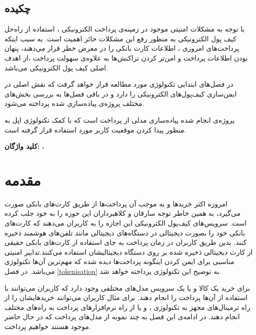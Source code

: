 \documentclass[oneside]{report}
\begin{document}
 
 \section*{چکیده}
\Large \noindent
با توجه به مشکلات امنیتی موجود در زمینه‌ی پرداخت الکترونیکی ، استفاده از راه‌حل‌ کیف پول الکترونیکی به منظور رفع این مشکلات حائز اهمیت است. به سبب اینکه پرداخت‌های امروزی ، اطلاعات کارت بانکی را در معرض خطر قرار می‌دهند، پنهان بودن اطلاعات پرداخت و امن‌تر کردن تراکنش‌ها به علاوه‌ی سهولت پرداخت ،از اهدف اصلی کیف پول ‌الکترونیکی می‌باشد.

\noindent
در فصل‌های ابتدایی تکنولوژی‌
	{\large {}}
مورد مطالعه قرار خواهد گرفت که نقش اصلی در ایمن‌سازی کیف‌پول‌های الکترونیکی را دارد و در باقی فصل‌ها به بررسی بخش‌های مختلف پروژه‌ی پیاده‌سازی شده پرداخته می‌شود.

\noindent
پروژه‌ی انجام شده پیاده‌سازی مدلی از پرداخت است که با کمک تکنولوژی
{\large {}}
اپل به منظور پیدا کردن موقعیت کاربر مورد استفاده قرار گرفته است.


\vspace*{1cm}
\noindent
\textbf{کلید واژگان: } 
{\large {}} ، {\large {}} 

{\let\cleardoublepage\clearpage 
	\tableofcontents
}
	\chapter{مقدمه}\label{introduction}
		امروزه اکثر خرید‌ها و به موجب آن پرداخت‌ها از طریق کارت‌های بانکی صورت می‌گیرد، به همین خاطر توجه سارقان و کلاهبرداران این حوزه را به خود جلب کرده است. سرویس‌های کیف‌پول الکترونیکی این اجازه را به کاربران می‌دهند که کارت‌های بانکی خود را بصورت دیجیتالی در دستگاه‌های دیجیتالی مانند تلفن‌های هوشمند ذخیره کنند. بدین طریق کاربران در زمان پرداخت به جای استفاده از کارت‌های بانکی حقیقی از کارت دیجیتالی ذخیره شده بر روی دستگاه دیجیتالیشان استفاده می‌کنند.تدابیر امنیتی مناسبی برای ایمن کردن اینگونه پرداخت‌ها دیده شده که  مهم‌ترین آن‌ها تکنولوژی  {\large {}}  می‌باشد. در فصل \ref{tokenisation} به توضیح این تکنولوژی پرداخته خواهد شد.
		
		برای خرید یک کالا و یا یک سرویس مدل‌های مختلفی وجود دارد که کاربران می‌توانند با استفاده از آن‌ها پرداخت را انجام دهند. برای مثال کاربران می‌توانند خریدهایشان را از راه ترمینال‌های مجهز به تکنولوژی 
			{\large {}}
			  ، و یا از راه نرم‌افزار‌های پرداخت به راه‌های مختلف انجام دهند. در ادامه‌ی این فصل به چند نمونه از مدل‌های پرداخت که در حال حاضر موجود هستند خواهیم پرداخت.		
			  
\end{document}
